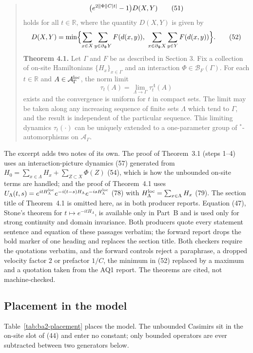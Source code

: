 \begin{quote}
\begin{equation*}
 \bigl(e^{2\left\lVert\Phi\right\rVert C|t|}-1\bigr)D(X,Y)\tag{51}
\end{equation*}
holds for all $t\in\mathbb R$, where the quantity $D(X,Y)$ is given by
\begin{equation*}
 D(X,Y)=\min\Bigl\{\sum_{x\in X}\sum_{y\in\partial_\Phi Y}F(d(x,y)),\
 \sum_{x\in\partial_\Phi X}\sum_{y\in Y}F(d(x,y))\Bigr\}.\tag{52}
\end{equation*}
\textbf{Theorem 4.1.} Let $\Gamma$ and $F$ be as described in Section 3. Fix a
collection of on-site Hamiltonians $\{H_x\}_{x\in\Gamma}$ and an interaction
$\Phi\in\mathcal B_F(\Gamma)$. For each $t\in\mathbb R$ and
$A\in\mathcal A_\Gamma^{\rm loc}$, the norm limit
\begin{equation*}
 \tau_t(A)=\lim_{\Lambda\to\Gamma}\tau^\Lambda_t(A)\tag{77}
\end{equation*}
exists and the convergence is uniform for $t$ in compact sets. The limit may
be taken along any increasing sequence of finite sets $\Lambda$ which tend to
$\Gamma$, and the result is independent of the particular sequence. This
limiting dynamics $\tau_t(\cdot)$ can be uniquely extended to a one-parameter
group of ${}^*$-automorphisms on $\mathcal A_\Gamma$.
\end{quote}

The excerpt adds two notes of its own. The proof of Theorem~3.1 (steps 1--4)
uses an interaction-picture dynamics (57) generated from
$H_0=\sum_{x\in\Lambda}H_x+\sum_{Z\subset X}\Phi(Z)$ (54), which is how the
unbounded on-site terms are handled; and the proof of Theorem~4.1 uses
$U_\Lambda(t,s)=e^{itH^{\rm loc}_\Lambda}e^{-i(t-s)H_\Lambda}
e^{-isH^{\rm loc}_\Lambda}$ (78) with $H^{\rm loc}_\Lambda=\sum_{x\in\Lambda}H_x$
(79). The section title of Theorem~4.1 is omitted here, as in both producer
reports. Equation (47), Stone's theorem for $t\mapsto e^{-itH_\Lambda}$, is
available only in Part~B and is used only for strong continuity and domain
invariance. Both producers quote every statement sentence and equation of
these passages verbatim; the forward report drops the bold marker of one
heading and replaces the section title. Both checkers require the quotations
verbatim, and the forward controls reject a paraphrase, a dropped velocity
factor 2 or prefactor $1/C$, the minimum in (52) replaced by a maximum and a
quotation taken from the AQ1 report. The theorems are cited, not
machine-checked.

\subsection{Placement in the model}
\label{sec:ba2-placement}
Table~\ref{tab:ba2-placement} places the model. The unbounded Casimirs sit in
the on-site slot of (44) and enter no constant; only bounded operators are
ever subtracted between two generators below.

